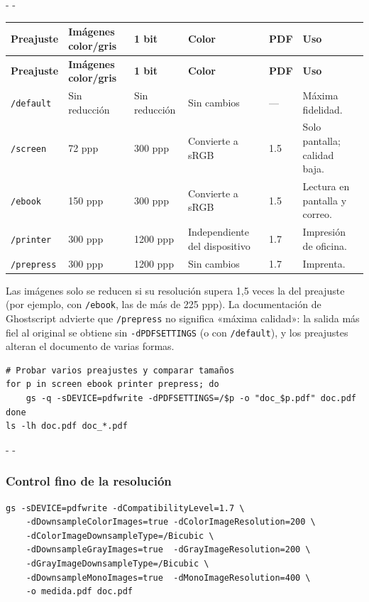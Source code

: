\documentclass[11pt,a4paper]{article}
\makeatletter
\newcommand{\necesitaespacio}[1]{\par\penalty-100\begingroup
	\setlength{\dimen@}{#1}\dimen@ii\pagegoal\advance\dimen@ii-\pagetotal
	\ifdim\dimen@>\dimen@ii\ifdim\dimen@ii>\z@\vfil\fi\penalty-\@M\fi\endgroup}
\newcommand{\opt}[1]{\texttt{\textcolor{colopt}{#1}}}      %
\newcommand{\val}[1]{\texttt{#1}}                          %
\newcommand{\cab}[1]{\textbf{#1}}
\makeatother
\begin{document}
	\begingroup\small
	\necesitaespacio{17\baselineskip}
	\begin{longtable}{L{2.0cm}L{2.6cm}L{1.5cm}L{2.96cm}L{1.0cm}L{3.1cm}}
		\toprule{}\cab{Preajuste} & \cab{Imágenes color/gris} & \cab{1 bit} & \cab{Color} & \cab{PDF} & \cab{Uso}\\\midrule
		\endfirsthead
		\toprule{}\cab{Preajuste} & \cab{Imágenes color/gris} & \cab{1 bit} & \cab{Color} & \cab{PDF} & \cab{Uso}\\\midrule
		\endhead
		\bottomrule
		\endfoot
		\val{/default} & Sin reducción & Sin reducción & Sin cambios & --- & Máxima fidelidad.\\*
		\val{/screen} & 72 ppp & 300 ppp & Convierte a sRGB & 1.5 & Solo pantalla; calidad baja.\\
		\val{/ebook} & 150 ppp & 300 ppp & Convierte a sRGB & 1.5 & Lectura en pantalla y correo.\\
		\val{/printer} & 300 ppp & 1200 ppp & Independiente del dispositivo & 1.7 & Impresión de oficina.\\*
		\val{/prepress} & 300 ppp & 1200 ppp & Sin cambios & 1.7 & Imprenta.\\
	\end{longtable}
	\endgroup
	
	Las imágenes solo se reducen si su resolución supera 1,5 veces la del preajuste (por ejemplo, con \val{/ebook}, las de más de 225 ppp). La documentación de Ghostscript advierte que \val{/prepress} no significa «máxima calidad»: la salida más fiel al original se obtiene sin \opt{-dPDFSETTINGS} (o con \val{/default}), y los preajustes alteran el documento de varias formas.
	
	\begin{lstlisting}
# Probar varios preajustes y comparar tamaños
for p in screen ebook printer prepress; do
    gs -q -sDEVICE=pdfwrite -dPDFSETTINGS=/$p -o "doc_$p.pdf" doc.pdf
done
ls -lh doc.pdf doc_*.pdf
\end{lstlisting}
	
	\necesitaespacio{6\baselineskip}
	\subsubsection{Control fino de la resolución}
	
	\begin{lstlisting}
gs -sDEVICE=pdfwrite -dCompatibilityLevel=1.7 \
    -dDownsampleColorImages=true -dColorImageResolution=200 \
    -dColorImageDownsampleType=/Bicubic \
    -dDownsampleGrayImages=true  -dGrayImageResolution=200 \
    -dGrayImageDownsampleType=/Bicubic \
    -dDownsampleMonoImages=true  -dMonoImageResolution=400 \
    -o medida.pdf doc.pdf
\end{lstlisting}
	
\end{document}
